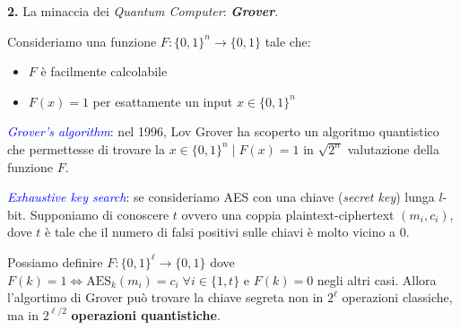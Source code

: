 \newpage

\begin{flushleft}
    \textbf{2.} La minaccia dei \textit{Quantum Computer}: \textbf{\textit{Grover}}\cite{grover}.
    \begin{boxA}
        Consideriamo una funzione $F: \{0, 1\}^n \rightarrow \{0, 1\}$ tale che:
        \begin{itemize}[nosep]
            \item $F$ è facilmente calcolabile
            \item $F(x) = 1$ per esattamente un input $x \in \{0, 1\}^n$
        \end{itemize}

        \textcolor{blue}{\textit{Grover's algorithm}}: nel 1996, Lov Grover ha scoperto un algoritmo quantistico che permettesse di trovare la $x \in \{0, 1\}^n \; | \; F(x) = 1$ in $\sqrt{2^n}$ valutazione della funzione $F$.
    \end{boxA}
    \textcolor{blue}{\textit{Exhaustive key search}}: se consideriamo AES con una chiave (\textit{secret key}) lunga $l$-bit. Supponiamo di conoscere $t$ ovvero una coppia plaintext-ciphertext $(m_i, c_i)$, dove $t$ è tale che il numero di falsi positivi sulle chiavi è molto vicino a 0.

    Possiamo definire $F: \{0, 1\}^{\ell} \rightarrow \{0, 1\}$ dove $F(k) = 1 \Leftrightarrow \text{AES}_k(m_i) = c_i \; \forall i \in \{1, t\}$ e $F(k) = 0$ negli altri casi. Allora l'algortimo di Grover può trovare la chiave segreta non in $2^{\ell}$ operazioni classiche, ma in $2^{{\ell}/2}$ \textbf{operazioni quantistiche}.
\end{flushleft}